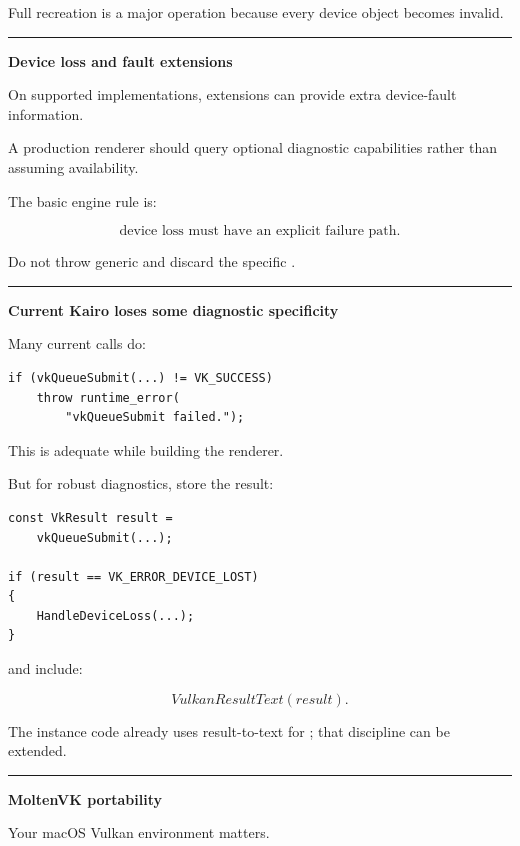 Full recreation is a major operation because every device object becomes invalid.

\begin{center}\rule{0.5\linewidth}{0.5pt}\end{center}

\textbf{Device loss and fault extensions}

On supported implementations, extensions can provide extra device-fault information.

A production renderer should query optional diagnostic capabilities rather than assuming availability.

The basic engine rule is:

\[
\boxed{
\text{device loss must have an explicit failure path}.
}
\]

Do not throw generic  and discard the specific .

\begin{center}\rule{0.5\linewidth}{0.5pt}\end{center}

\textbf{Current Kairo loses some diagnostic specificity}

Many current calls do:

\begin{verbatim}
if (vkQueueSubmit(...) != VK_SUCCESS)
    throw runtime_error(
        "vkQueueSubmit failed.");
\end{verbatim}

This is adequate while building the renderer.

But for robust diagnostics, store the result:

\begin{verbatim}
const VkResult result =
    vkQueueSubmit(...);

if (result == VK_ERROR_DEVICE_LOST)
{
    HandleDeviceLoss(...);
}
\end{verbatim}

and include:

\[
VulkanResultText(result).
\]

The instance code already uses result-to-text for ; that discipline can be extended.

\begin{center}\rule{0.5\linewidth}{0.5pt}\end{center}

\textbf{MoltenVK portability}

Your macOS Vulkan environment matters.

